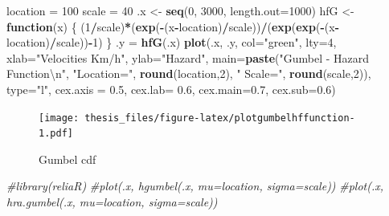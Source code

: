 \documentclass[12pt,twoside]{reedthesis}
\newenvironment{Shaded}{\begin{snugshade}}{\end{snugshade}}
\newcommand{\CharTok}[1]{\textcolor[rgb]{0.31,0.60,0.02}{#1}}
\newcommand{\CommentTok}[1]{\textcolor[rgb]{0.56,0.35,0.01}{\textit{#1}}}
\newcommand{\ControlFlowTok}[1]{\textcolor[rgb]{0.13,0.29,0.53}{\textbf{#1}}}
\newcommand{\DataTypeTok}[1]{\textcolor[rgb]{0.13,0.29,0.53}{#1}}
\newcommand{\DecValTok}[1]{\textcolor[rgb]{0.00,0.00,0.81}{#1}}
\newcommand{\FloatTok}[1]{\textcolor[rgb]{0.00,0.00,0.81}{#1}}
\newcommand{\KeywordTok}[1]{\textcolor[rgb]{0.13,0.29,0.53}{\textbf{#1}}}
\newcommand{\NormalTok}[1]{#1}
\newcommand{\OperatorTok}[1]{\textcolor[rgb]{0.81,0.36,0.00}{\textbf{#1}}}
\newcommand{\StringTok}[1]{\textcolor[rgb]{0.31,0.60,0.02}{#1}}
\begin{document}
\footnotesize
\begin{Shaded}
\begin{Highlighting}[]
\NormalTok{location =}\StringTok{ }\DecValTok{100}
\NormalTok{scale =}\StringTok{ }\DecValTok{40}
\NormalTok{.x <-}\StringTok{ }\KeywordTok{seq}\NormalTok{(}\DecValTok{0}\NormalTok{, }\DecValTok{3000}\NormalTok{, }\DataTypeTok{length.out=}\DecValTok{1000}\NormalTok{)}
\NormalTok{hfG <-}\StringTok{ }\ControlFlowTok{function}\NormalTok{(x) \{}
\NormalTok{  (}\DecValTok{1}\OperatorTok{/}\NormalTok{scale)}\OperatorTok{*}\NormalTok{(}\KeywordTok{exp}\NormalTok{(}\OperatorTok{-}\NormalTok{(x}\OperatorTok{-}\NormalTok{location)}\OperatorTok{/}\NormalTok{scale))}\OperatorTok{/}\NormalTok{(}\KeywordTok{exp}\NormalTok{(}\KeywordTok{exp}\NormalTok{(}\OperatorTok{-}\NormalTok{(x}\OperatorTok{-}\NormalTok{location)}\OperatorTok{/}\NormalTok{scale))}\OperatorTok{-}\DecValTok{1}\NormalTok{)}
\NormalTok{  \}}
\NormalTok{.y =}\StringTok{ }\KeywordTok{hfG}\NormalTok{(.x)}
\KeywordTok{plot}\NormalTok{(.x, .y, }\DataTypeTok{col=}\StringTok{"green"}\NormalTok{, }\DataTypeTok{lty=}\DecValTok{4}\NormalTok{, }
     \DataTypeTok{xlab=}\StringTok{"Velocities Km/h"}\NormalTok{, }\DataTypeTok{ylab=}\StringTok{"Hazard"}\NormalTok{, }
     \DataTypeTok{main=}\KeywordTok{paste}\NormalTok{(}\StringTok{"Gumbel - Hazard Function}\CharTok{\textbackslash{}n}\StringTok{"}\NormalTok{, }\StringTok{"Location="}\NormalTok{, }
     \KeywordTok{round}\NormalTok{(location,}\DecValTok{2}\NormalTok{), }\StringTok{" Scale="}\NormalTok{, }\KeywordTok{round}\NormalTok{(scale,}\DecValTok{2}\NormalTok{)), }\DataTypeTok{type=}\StringTok{"l"}\NormalTok{, }
     \DataTypeTok{cex.axis =} \FloatTok{0.5}\NormalTok{, }\DataTypeTok{cex.lab=} \FloatTok{0.6}\NormalTok{, }\DataTypeTok{cex.main=}\FloatTok{0.7}\NormalTok{, }\DataTypeTok{cex.sub=}\FloatTok{0.6}\NormalTok{)}
\end{Highlighting}
\end{Shaded}
\begin{figure}
\centering
\texttt{[image: thesis\_files/figure-latex/plotgumbelhffunction-1.pdf]}
\caption{\label{fig:plotgumbelhffunction}Gumbel cdf}
\end{figure}
\begin{Shaded}
\begin{Highlighting}[]
\CommentTok{#library(reliaR)}
\CommentTok{#plot(.x, hgumbel(.x, mu=location, sigma=scale))}
\CommentTok{#plot(.x, hra.gumbel(.x, mu=location, sigma=scale))}
\end{Highlighting}
\end{Shaded}
\normalsize
\end{document}
